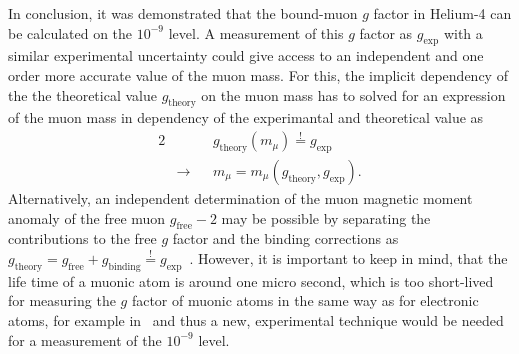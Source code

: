 In conclusion, it was demonstrated that the bound-muon $g$ factor in Helium-4 can be calculated on the $10^{-9}$ level. A measurement of this $g$ factor as $g_{\text{exp}}$ with a similar experimental uncertainty could give access to an independent and one order more accurate value of the muon mass. For this, the implicit dependency of the the theoretical value $g_{\text{theory}}$ on the muon mass has to solved for an expression of the muon mass in dependency of the experimantal and theoretical value as
\begin{alignat}{2}
&&&g_{\text{theory}}(m_\mu)\overset{!}{=}g_{\text{exp}}\\
&\rightarrow &&m_\mu=m_\mu (g_{\text{theory}},g_{\text{exp}}).
\end{alignat}
 Alternatively, an independent determination of the muon magnetic moment anomaly of the free muon $g_{\text{free}}-2$ may be possible by separating the  contributions to the free $g$ factor and the binding corrections as $g_{\text{theory}}=g_{\text{free}}+g_{\text{binding}}\overset{!}{=}g_{\text{exp}}$~\cite{sikora2018}.
However, it is important to keep in mind, that the life time of a muonic atom is around one micro second, which is too short-lived for measuring the $g$ factor of muonic atoms in the same way as for electronic atoms, for example in~\cite{Sturm2011,Sturm2014} and thus a new, experimental technique would be needed for a measurement of the $10^{-9}$ level.

